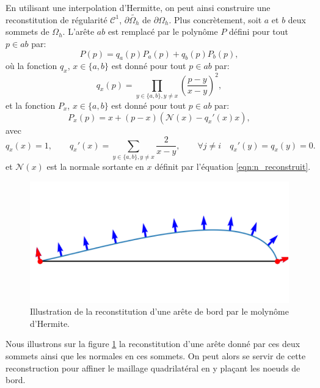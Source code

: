 En utilisant une interpolation d'Hermitte, on peut ainsi construire une reconstitution de régularité $\mathcal{C}^1$, $\partial\widetilde{\Omega_h}$ de $\partial\Omega_h$. Plus concrètement, soit $a$ et $b$ deux sommets de $\Omega_h$. L'arête $ab$ est remplacé par le polynôme $P$ défini pour tout $p\in ab$ par:
\[P(p) = q_a(p)P_a(p)+q_b(p)P_b(p),\]
où la fonction $q_x$, $x\in\{a, b\}$ est donné pour tout $p\in ab$ par:
\[q_x(p) = \prod_{y\in\{a,b\}, y\neq x} \left(\frac{p - y}{x - y}\right)^2,\]
et la fonction $P_x$, $x\in\{a, b\}$ est donné pour tout $p\in ab$ par:
\[P_x(p) = x + (p - x) \left(\mathcal{N}(x) - q_x'(x)x\right),\]
avec
\[q_x(x)=1,\quad\quad
q_x'(x)=\sum_{y\in\{a,b\}, y\neq x}\frac{2}{x - y},\quad\quad
\forall j \neq i \quad q_x'(y) = q_x(y) = 0.
\]
et $\mathcal{N}(x)$ est la normale sortante en $x$ définit par l'équation \eqref{eqn:n_reconstruit}.\\
\begin{figure}[!h]
\centering
\includegraphics[scale=0.58]{images/hermite.pdf}
\caption{Illustration de la reconstitution d'une arête de bord par le molynôme d'Hermite.}
\label{fig:hermite}
\end{figure}
Nous illustrons sur la figure \ref{fig:hermite} la reconstitution d'une arête donné par ces deux sommets ainsi que les normales en ces sommets. On peut alors se servir de cette reconstruction pour affiner le maillage quadrilatéral en y plaçant les noeuds de bord.

